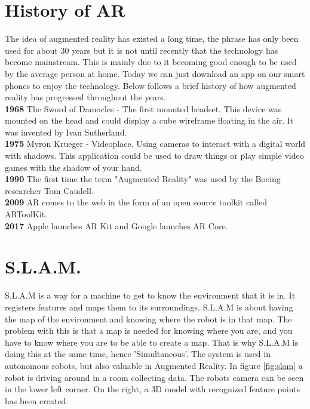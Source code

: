 \section{History of AR}
\label{sec:ARhistory}
The idea of augmented reality has existed a long time, the phrase has only been used for about 30 years but it is not until recently that the technology has become mainstream.
This is mainly due to it becoming good enough to be used by the average person at home. Today we can just download an app on our smart phones to enjoy the technology. Below follows a brief history of how augmented reality has progressed throughout the years.\\

\textbf{1968}
The Sword of Damocles - The first mounted headset.
This device was mounted on the head and could display a cube wireframe floating in the air. It was invented by Ivan Sutherland.\\

\textbf{1975}
Myron Krueger - Videoplace. Using cameras to interact with a digital world with shadows.
This application could be used to draw things or play simple video games with the shadow of your hand.
\cite{videoplace}\\

\textbf{1990}
The first time the term "Augmented Reality" was used by the Boeing researcher Tom Caudell.\\

\textbf{2009}
AR comes to the web in the form of an open source toolkit called ARToolKit.\\

\textbf{2017}
Apple launches AR Kit and Google launches AR Core.\\

\section{S.L.A.M.}
\label{sec:ARslam}
S.L.A.M is a way for a machine to get to know the environment that it is in. It registers features and maps them to its surroundings. S.L.A.M is about having the map of the environment and knowing where the robot is in that map.
The problem with this is that a map is needed for knowing where you are, and you have to know where you are to be able to create a map. That is why S.L.A.M is doing this at the same time, hence 'Simultaneous'. The system is used in autonomous robots, but also valuable in Augmented Reality. \cite{slam}
In figure \ref{fig:slam} a robot is driving around in a room collecting data. The robots 
camera can be seen in the lower left corner. On the right, a 3D model with 
recognized feature points has been created.

